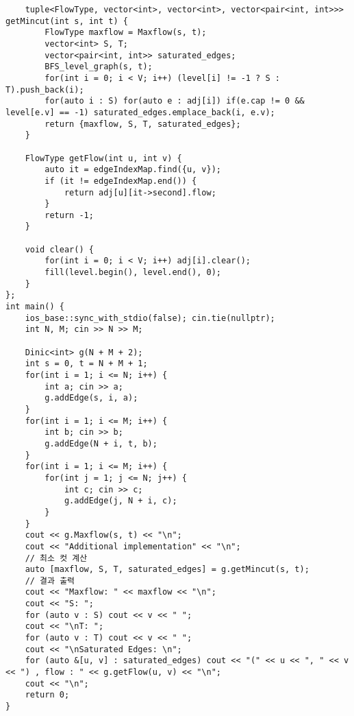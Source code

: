\documentclass[landscape, 8pt, a4paper, oneside, twocolumn]{extarticle}
\begin{document}
\begin{verbatim}
    tuple<FlowType, vector<int>, vector<int>, vector<pair<int, int>>> getMincut(int s, int t) {
        FlowType maxflow = Maxflow(s, t);
        vector<int> S, T;
        vector<pair<int, int>> saturated_edges;
        BFS_level_graph(s, t);
        for(int i = 0; i < V; i++) (level[i] != -1 ? S : T).push_back(i);
        for(auto i : S) for(auto e : adj[i]) if(e.cap != 0 && level[e.v] == -1) saturated_edges.emplace_back(i, e.v);
        return {maxflow, S, T, saturated_edges};
    }

    FlowType getFlow(int u, int v) {
        auto it = edgeIndexMap.find({u, v});
        if (it != edgeIndexMap.end()) {
            return adj[u][it->second].flow;
        }
        return -1;
    }

    void clear() {
        for(int i = 0; i < V; i++) adj[i].clear();
        fill(level.begin(), level.end(), 0);
    }
};
int main() {
    ios_base::sync_with_stdio(false); cin.tie(nullptr);
    int N, M; cin >> N >> M;

    Dinic<int> g(N + M + 2);
    int s = 0, t = N + M + 1;
    for(int i = 1; i <= N; i++) {
        int a; cin >> a;
        g.addEdge(s, i, a);
    }
    for(int i = 1; i <= M; i++) {
        int b; cin >> b;
        g.addEdge(N + i, t, b);
    }
    for(int i = 1; i <= M; i++) {
        for(int j = 1; j <= N; j++) {
            int c; cin >> c;
            g.addEdge(j, N + i, c);
        }
    }
    cout << g.Maxflow(s, t) << "\n";
    cout << "Additional implementation" << "\n";
    // 최소 컷 계산
    auto [maxflow, S, T, saturated_edges] = g.getMincut(s, t);
    // 결과 출력
    cout << "Maxflow: " << maxflow << "\n";
    cout << "S: ";
    for (auto v : S) cout << v << " ";
    cout << "\nT: ";
    for (auto v : T) cout << v << " ";
    cout << "\nSaturated Edges: \n";
    for (auto &[u, v] : saturated_edges) cout << "(" << u << ", " << v << ") , flow : " << g.getFlow(u, v) << "\n";
    cout << "\n";
    return 0;
}
    \end{verbatim}
\end{document}
